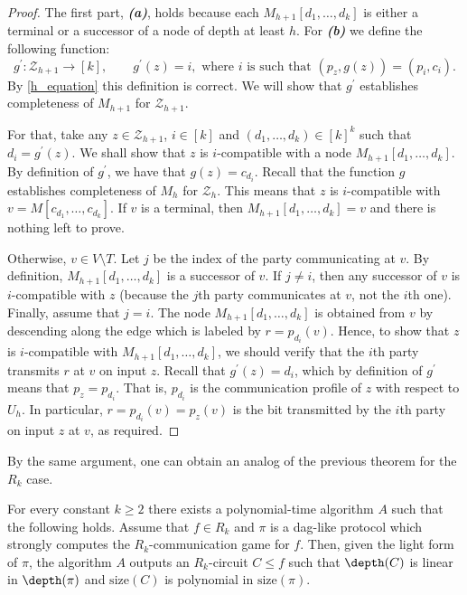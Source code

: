 \begin{proof}
The first part, \textbf{\emph{(a)}}, holds because each $M_{h + 1}[d_1, \ldots, d_k]$ is either a terminal or a successor of a node of depth at least $h$. For \textbf{\emph{(b)}}  we define the following function:
\[g^\prime\colon\mathcal{Z}_{h + 1}\to [k], \qquad g^\prime(z) = i, \mbox{ where $i$ is such that } (p_z, g(z)) = (p_i, c_i).\]
By \eqref{h_equation} this definition is correct. We will show that $g^\prime$ establishes completeness  of $M_{h + 1}$ for $\mathcal{Z}_{h + 1}$.

For that, take any $z\in\mathcal{Z}_{h + 1}$,  $i\in [k]$ and  $(d_1, \ldots, d_k) \in [k]^k$ such that $d_i = g^\prime(z)$. We shall show that $z$ is $i$-compatible with a node $M_{h + 1}[d_1, \ldots, d_k]$. By definition of $g^\prime$, we have that $g(z) = c_{d_i}$. Recall that the function $g$ establishes completeness of $M_h$ for $\mathcal{Z}_h$. This means that $z$ is $i$-compatible with $v = M[c_{d_1}, \ldots, c_{d_k}]$. If $v$ is a terminal, then $M_{h+1}[d_1, \ldots, d_k] = v$ and there is nothing left to prove.

 Otherwise, $v\in V\setminus T$. Let $j$ be the index of the party communicating at $v$. By definition, $M_{h + 1}[d_1, \ldots, d_k]$ is a successor of $v$. If $j\neq i$, then any successor of $v$ is $i$-compatible with $z$ (because the $j$th party communicates at $v$, not the $i$th one). Finally, assume that $j = i$. The node $M_{h + 1}[d_1, \ldots, d_k]$ is obtained from $v$ by descending along the edge which is labeled by $r = p_{d_i}(v)$. Hence, to show that $z$ is $i$-compatible with $M_{h + 1}[d_1, \ldots, d_k]$, we should verify that the $i$th party transmits $r$ at $v$ on input $z$. Recall that $g^\prime(z) = d_i$, which by definition of $g^\prime$ means that $p_z = p_{d_i}$. That is, $p_{d_i}$ is the communication profile of $z$ with respect to $U_h$. In particular, $r = p_{d_i}(v) = p_z(v)$ is the bit transmitted by the $i$th party on input $z$ at $v$, as required.
\end{proof}

%
By    %
the same argument, one can obtain an analog of the previous theorem for the
%
$R_k$ case.   %
\begin{theorem}
\label{efficient_R_k}
For every constant $k\ge 2$ there exists  a polynomial-time algorithm $A$ such that the following holds. Assume that $f\in R_k$ and $\pi$ is a dag-like protocol which strongly computes  the $R_k$-communication game for $f$. Then, given the light form of $\pi$, the algorithm $A$ outputs an $R_k$-circuit $C \le f$ such that $\depth(C)$ is linear in $\depth(\pi)$ and $\mathrm{size}(C)$ is polynomial in $\mathrm{size}(\pi)$. 
\end{theorem}



